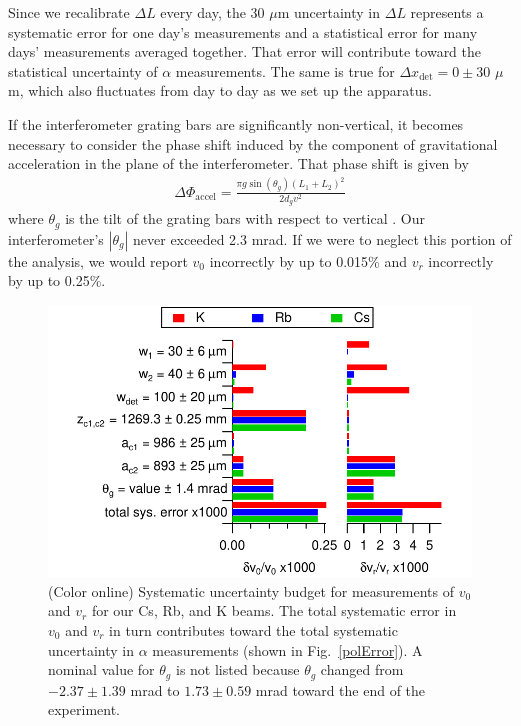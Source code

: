 \documentclass[twocolumn,prl,showpacs,superscriptaddress]{revtex4-1}   %
\newcommand{\figref}[1]{Fig.~\ref{#1}}
\newcommand{\dphiaccel}{\Delta\Phi_{\mathrm{accel}}}
\begin{document}
Since we recalibrate $\Delta L$ every day, the 30 $\mu$m uncertainty in $\Delta L$ represents a systematic error for one day's measurements and a statistical error for many days' measurements averaged together. That error will contribute toward the statistical uncertainty of $\alpha$ measurements.
The same is true for $\Delta x_{\mathrm{det}} = 0 \pm 30$ $\mu$m, which also fluctuates from day to day as we set up the apparatus.

If the interferometer grating bars are significantly non-vertical, it becomes necessary to consider the phase shift induced by the component of gravitational acceleration in the plane of the interferometer. That phase shift is given by
\begin{align}
	\dphiaccel = \frac{\pi g\sin({\theta_g})(L_1+L_2)^2}{2d_g v^2}
	\label{phiAccel}
\end{align}
where $\theta_g$ is the tilt of the grating bars with respect to vertical \cite{Greenberg2014}. 
Our interferometer's $|\theta_g|$ never exceeded 2.3 mrad. If we were to neglect this portion of the analysis, we would report $v_0$ incorrectly by up to 0.015\% and $v_r$ incorrectly by up to 0.25\%.

\begin{figure}
\includegraphics[width=\linewidth,keepaspectratio]{displayVelErrors.pdf}
\caption{\label{velError}(Color online) Systematic uncertainty budget for measurements of $v_0$ and $v_r$ for our Cs, Rb, and K beams. 
The total systematic error in $v_0$ and $v_r$ in turn contributes toward the total systematic uncertainty in $\alpha$ measurements (shown in \figref{polError}).
A nominal value for $\theta_g$ is not listed because $\theta_g$ changed from $-2.37 \pm 1.39$ mrad to $1.73 \pm 0.59$ mrad toward the end of the experiment.}
\end{figure}
\end{document}
